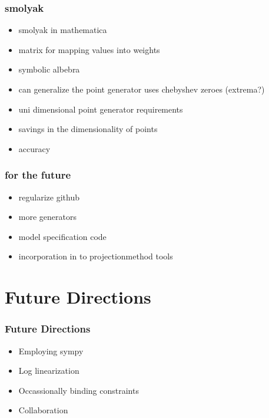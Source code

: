 \documentclass[handout]{beamer}
\begin{document}
\begin{frame}
  \frametitle{smolyak}

  \begin{itemize}
  \item smolyak in mathematica
  \item matrix for mapping values into weights
  \item symbolic albebra
  \item can generalize the point generator uses chebyshev zeroes (extrema?)
  \item uni dimensional point generator requirements
  \item savings in the dimensionality of points
  \item accuracy
  \end{itemize}
\end{frame}


\begin{frame}
  \frametitle{for the future}
  \begin{itemize}
  \item regularize github
  \item more generators
  \item model specification code
  \item incorporation in to projectionmethod tools
  \end{itemize}
\end{frame}





\section{Future Directions}

\begin{frame}
  \frametitle{Future Directions}
  \begin{itemize}
  \item Employing sympy
 \item Log linearization 
\item Occassionally binding constraints
\item Collaboration %
  \end{itemize}
\end{frame}
\end{document}
